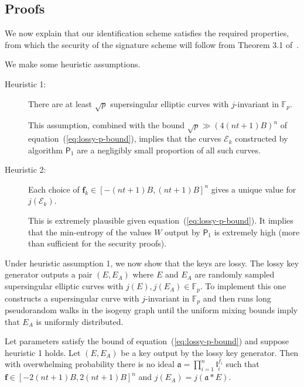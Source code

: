 \documentclass{llncs}
\newcommand{\E}{\mathcal{E}}
\newcommand{\F}{\mathbb{F}}
\renewcommand{\a}{\mathfrak{a}}
\renewcommand{\l}{\mathfrak{l}}
\newcommand{\f}{\mathbf{f}}
\newcommand{\PP}{\mathsf{P}}
\begin{document}
\subsection{Proofs}

We now explain that our identification scheme satisfies the required properties, from which the security of the signature scheme will follow from Theorem 3.1 of~\cite{KLS18}.

We make some heuristic assumptions.
\begin{description}
\item[Heuristic 1:] There are at least $\sqrt{p}$ supersingular elliptic curves with $j$-invariant in $\F_p$.

This assumption, combined with the bound $\sqrt{p} \gg (4(nt+1)B)^n $ of equation~(\ref{eq:lossy-p-bound}), implies that the curves $\E_k$ constructed by algorithm $\PP_1$ are a negligibly small proportion of all such curves.

\item[Heuristic 2:] Each choice of $\f_k \in [-(nt+1)B,(nt+1)B]^n$ gives a unique value for $j(\E_k)$.

This is extremely plausible given equation~(\ref{eq:lossy-p-bound}). It implies that the min-entropy of the values $W$ output by $\PP_1$ is extremely high (more than sufficient for the security proofs).

%
\end{description}

Under heuristic assumption 1, we now show that the keys are lossy.
The lossy key generator outputs a pair $(E,E_A)$ where $E$ and $E_A$ are randomly sampled supersingular elliptic curves with $j(E), j(E_A) \in \F_p$.
To implement this one constructs a supersingular curve with $j$-invariant in $\F_p$
and then runs long pseudorandom walks in the isogeny graph until the uniform mixing bounds imply that $E_A$ is uniformly distributed.

\begin{lemma}\label{lem:isogeny count}
Let parameters satisfy the bound of equation~(\ref{eq:lossy-p-bound}) and suppose heuristic 1 holds. Let $(E,E_A)$ be a key output by the lossy key generator. Then with overwhelming probability there is no ideal $\a = \prod_{i=1}^n \l_i^{f_{i}}$ such that $\f \in [-2(nt+1)B,2(nt+1)B]^{n}$ and $j(E_A) = j( \a * E )$.
\end{lemma}
\end{document}
